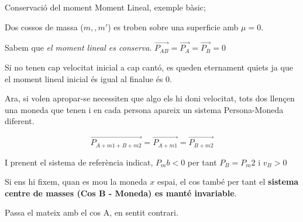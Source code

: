 \documentclass[12pt]{article}
\newcommand{\person}[2]{%
  \draw[#2, line width=1.1pt] (#1,0.35) -- (#1,0.9)
      (#1,0.35) -- ++(-0.15,-0.35) (#1,0.35) -- ++(0.15,-0.35)
      (#1,0.75) -- ++(-0.22,-0.2) (#1,0.75) -- ++(0.22,-0.2);
  \fill[cO] (#1,1.08) circle (0.16);}
\begin{document}
\begin{examplebox}{Conservació del moment}
    Moment Lineal, exemple bàsic;

   \begin{center}
    \end{center}

    Dos cossos de massa ($m,, m'$) es troben sobre una superficie amb $\mu = 0$.

    Sabem que \textit{el moment lineal es conserva}. $\vec{P_{AB}} = \vec{P_{A}} = \vec{P_{B}} = 0$

    Si no tenen cap velocitat inicial a cap cantó, es queden eternament quiets ja que el moment lineal inicial és igual al finalue és 0.

    Ara, si volen apropar-se necessiten que algo els hi doni velocitat, tots dos llençen una moneda que tenen i en cada persona apareix un sistema Persona-Moneda diferent.

    \[\vec{P_{A+m1+B+m2}} = \vec{P_{A+m1}} = \vec{P_{B+m2}}\]
    
    \begin{center}
\end{center}

    I prenent el sistema de referència indicat, $P_mb < 0$ per tant $P_B = P_m2$ i $v_B > 0$

    Si ens hi fixem, quan es mou la moneda $x$ espai, el cos també per tant el \textbf{sistema centre de masses (Cos B - Moneda) es manté invariable}.

    Passa el mateix amb el cos A, en sentit contrari.
\end{examplebox}
\end{document}
